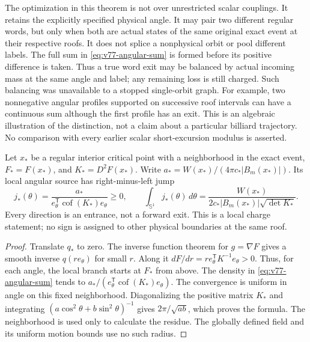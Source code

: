 The optimization in this theorem is not over unrestricted scalar
couplings. It retains the explicitly specified physical angle. It
may pair two different regular words, but only when both are actual
states of the same original exact event at their respective roofs.
It does not splice a nonphysical orbit or pool different labels.
The full sum in \eqref{eq:v77-angular-sum} is formed before its
positive difference is taken. Thus a true word exit may be balanced
by actual incoming mass at the same angle and label; any remaining
loss is still charged. Such balancing was unavailable to a stopped
single-orbit graph. For example, two nonnegative angular profiles
supported on successive roof intervals can have a continuous sum
although the first profile has an exit. This is an algebraic
illustration of the distinction, not a claim about a particular
billiard trajectory. No comparison with every earlier scalar
short-excursion modulus is asserted.

\begin{proposition}
\label{prop:v77-angular-residue}
Let $x_*$ be a regular interior critical point with a neighborhood
in the exact event, $F_*=F(x_*)$, and $K_*=D^2F(x_*)$.
Write $a_*=W(x_*)/(4\pi c_*|B_m(x_*)|)$. Its local angular
source has right-minus-left jump
\begin{equation}\label{eq:v77-angular-residue}
 j_*(\theta)=\frac{a_*}
       {e_\theta^{\mathsf T}\operatorname{cof}(K_*)e_\theta}\ge0,
 \qquad
 \int_{\mathbb S^1}j_*(\theta)\,d\theta
     =\frac{W(x_*)}{2c_*|B_m(x_*)|\sqrt{\det K_*}}.
\end{equation}
Every direction is an entrance, not a forward exit. This is a local
charge statement; no sign is assigned to other physical boundaries
at the same roof.
\end{proposition}
\begin{proof}
Translate $q_*$ to zero. The inverse function theorem for
$g=\nabla F$ gives a smooth inverse $q(r e_\theta)$ for small $r$.
Along it $dF/dr=r e_\theta^{\mathsf T}K^{-1}e_\theta>0$.
Thus, for each angle, the local branch starts at $F_*$ from above.
The density in \eqref{eq:v77-angular-sum} tends to
$a_*/(e_\theta^{\mathsf T}\operatorname{cof}(K_*)e_\theta)$.
The convergence is uniform in angle on this fixed neighborhood.
Diagonalizing the positive matrix $K_*$ and integrating
$(a\cos^2\theta+b\sin^2\theta)^{-1}$ gives
$2\pi/\sqrt{ab}$, which proves the formula. The neighborhood
is used only to calculate the residue. The globally defined field
and its uniform motion bounds use no such radius.
\end{proof}
